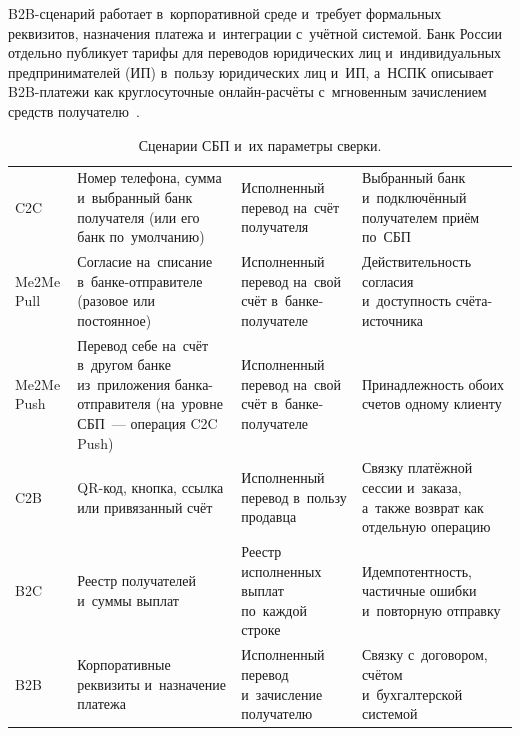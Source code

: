 B2B-сценарий работает в~корпоративной среде и~требует формальных реквизитов,
назначения платежа и~интеграции с~учётной системой. Банк России отдельно
публикует тарифы для переводов юридических лиц и~индивидуальных предпринимателей
(ИП) в~пользу юридических лиц и~ИП, а~НСПК описывает B2B-платежи как
круглосуточные онлайн-расчёты с~мгновенным зачислением средств
получателю~\cite{cbr-ps,nspk-sbp-b2b}.

\begin{table}[!htbp]
  \caption{Сценарии СБП и~их параметры
  сверки.}\label{tab:sbp-scenarios}
  \begingroup
  \tablesetup
  \begin{tabularx}{\textwidth}{
      @{}P{0.11\textwidth}
      P{0.23\textwidth}
      Y
      Y@{}
    }
    \toprule
    \headrow
     &  &
     &
     \\
    \midrule
    C2C & Номер телефона, сумма и~выбранный банк получателя (или его
    банк по~умолчанию) &
    Исполненный перевод на~счёт получателя &
    Выбранный банк и~подключённый получателем приём по~СБП \\
    \rowsep
    Me2Me Pull & Согласие на~списание в~банке-отправителе
    (разовое или постоянное) &
    Исполненный перевод на~свой счёт в~банке-получателе &
    Действительность согласия и~доступность счёта-источника \\
    \rowsep
    Me2Me Push & Перевод себе на~счёт в~другом банке из~приложения
    банка-отправителя (на~уровне СБП~--- операция C2C Push) &
    Исполненный перевод на~свой счёт в~банке-получателе &
    Принадлежность обоих счетов одному клиенту \\
    \rowsep
    C2B & QR-код, кнопка, ссылка или привязанный счёт &
    Исполненный перевод в~пользу продавца &
    Связку платёжной сессии и~заказа, а~также возврат как отдельную
    операцию \\
    \rowsep
    B2C & Реестр получателей и~суммы выплат &
    Реестр исполненных выплат по~каждой строке &
    Идемпотентность, частичные ошибки и~повторную отправку \\
    \rowsep
    B2B & Корпоративные реквизиты и~назначение платежа &
    Исполненный перевод и~зачисление получателю &
    Связку с~договором, счётом и~бухгалтерской системой \\
    \bottomrule
  \end{tabularx}\par
  \endgroup
\end{table}

